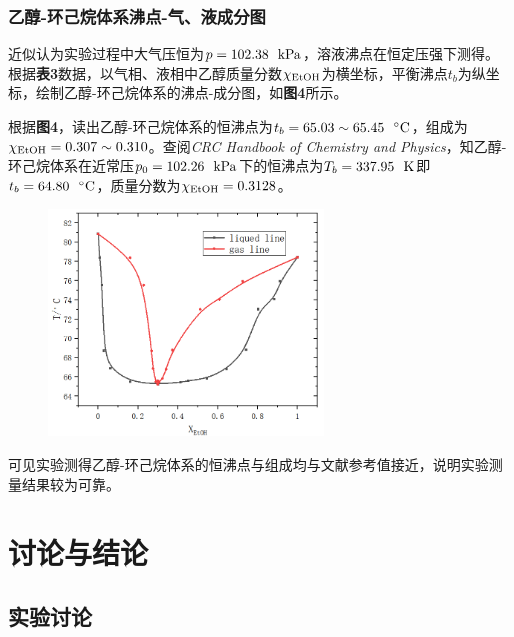 \documentclass[12pt]{article}
\begin{document}
				\subsubsection{乙醇-环己烷体系沸点-气、液成分图}
				近似认为实验过程中大气压恒为$p=102.38\ \ {\rm kPa}$，溶液沸点在恒定压强下测得。根据\textbf{表3}数据，以气相、液相中乙醇质量分数$\chi_{\ce{EtOH}}$为横坐标，平衡沸点$t_{b}$为纵坐标，绘制乙醇-环己烷体系的沸点-成分图，如\textbf{图4}所示。\par
				根据\textbf{图4}，读出乙醇-环己烷体系的恒沸点为$t_{b}=65.03\sim 65.45\ \ {\rm ^{\circ}C}$，组成为$\chi_{\ce{EtOH}}=0.307 \sim 0.310$。查阅\textit{CRC Handbook of Chemistry and Physics}\citealp{crc}，知乙醇-环己烷体系在近常压$p_{0}=102.26\ \ {\rm kPa}$下的恒沸点为$T_{b}=337.95\ \ {\rm K}$即$t_{b}=64.80\ \ {\rm ^{\circ}C}$，质量分数为$\chi_{\ce{EtOH}}=0.3128$。\par
				\begin{figure}[!h]
					\centering
					\includegraphics[width=0.65\textwidth]{4.png}
				\end{figure}
				\par
				可见实验测得乙醇-环己烷体系的恒沸点与组成均与文献参考值接近，说明实验测量结果较为可靠。\par

					\section{讨论与结论}
					\subsection{实验讨论}
\end{document}

